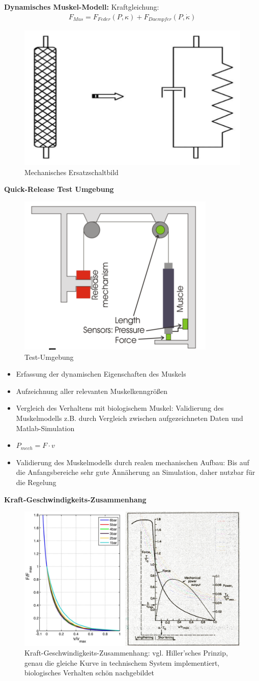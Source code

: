 \noindent
\textbf{Dynamisches Muskel-Modell:}
Kraftgleichung:
\begin{align*}
	F_{Mus} = F_{Feder}(P, \kappa) + F_{Daempfer}(P, \dot{\kappa})   
\end{align*}
\begin{figure}[h!]
	\centering
	\includegraphics[width=0.25\linewidth]{figures/ch03_dyn-modell.png}
	\caption{Mechanisches Ersatzschaltbild}
	\label{dm}
\end{figure}
\newpage
\noindent
\textbf{Quick-Release Test Umgebung}
\begin{figure}[h!]
	\centering
	\includegraphics[width=0.3\linewidth]{figures/ch03_testumgebung.png}
	\caption{Test-Umgebung}
	\label{tu}
\end{figure}
\begin{itemize}
	\item Erfassung der dynamischen Eigenschaften des Muskels
	\item Aufzeichnung aller relevanten Muskelkenngrößen
	\item Vergleich des Verhaltens mit biologischem Muskel: Validierung des Muskelmodells z.B. durch Vergleich zwischen aufgezeichneten Daten und Matlab-Simulation
	\item $P_{mech} = F \cdot v$
	\item Validierung des Muskelmodells durch realen mechanischen Aufbau: Bis auf die Anfangsbereiche sehr gute Ännäherung an Simulation, daher nutzbar für die Regelung
\end{itemize}

\textbf{Kraft-Geschwindigkeits-Zusammenhang}
\begin{figure}[h!]
	\centering
	\includegraphics[width=0.8\linewidth]{figures/ch03_pv-zshang.png}
	\caption{Kraft-Geschwindigkeits-Zusammenhang: vgl. Hiller'sches Prinzip, genau die gleiche Kurve in technischem System implementiert, biologisches Verhalten schön nachgebildet}
	\label{tu}
\end{figure}

